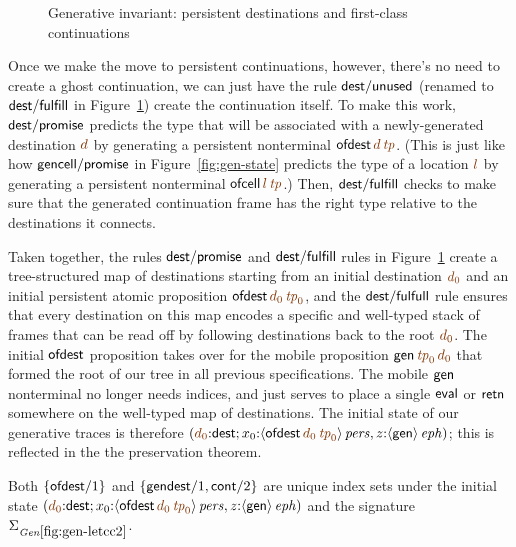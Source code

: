 \smallskip
{}
\smallskip

\begin{figure}[tp]
\caption{Generative invariant: persistent destinations and first-class
  continuations}
\label{fig:gen-letcc2} 
\end{figure}

Once we make the move to persistent continuations, however, there's no
need to create a ghost continuation, we can just have the rule ${\sf
  dest/unused}$ (renamed to ${\sf dest/fulfill}$ in
Figure~\ref{fig:gen-letcc2}) create the continuation itself.  To make
this work, ${\sf dest/promise}$ predicts the type that will be
associated with a newly-generated destination $\lf{d}$ by generating a
persistent nonterminal ${\sf ofdest}\,\lf{d}\,\lf{{\it tp}}$. (This is
just like how ${\sf gencell/promise}$ in Figure~\ref{fig:gen-state}
predicts the type of a location $\lf{l}$ by generating a persistent
nonterminal ${\sf ofcell}\,\lf{l}\,\lf{{\it tp}}$.) Then, ${\sf
  dest/fulfill}$ checks to make sure that the generated continuation
frame has the right type relative to the destinations it connects.

Taken together, the rules ${\sf dest/promise}$ and ${\sf
  dest/fulfill}$ rules in Figure~\ref{fig:gen-letcc2} create a
tree-structured map of destinations starting from an initial
destination $\lf{d_0}$ and an initial persistent atomic proposition
${\sf ofdest}\,\lf{d_0}\,\lf{{\it tp}_0}$, and the ${\sf
  dest/fulfull}$ rule ensures that every destination on this map
encodes a specific and well-typed stack of frames that can be read off
by following destinations back to the root $\lf{d_0}$.  The initial
${\sf ofdest}$ proposition takes over for the mobile proposition ${\sf
  gen}\,\lf{{\it tp}_0}\,\lf{d_0}$ that formed the root of our tree in
all previous specifications. The mobile ${\sf gen}$
nonterminal no longer needs indices, and just serves to place a single
${\sf eval}$ or ${\sf retn}$ somewhere on the well-typed map of
destinations. The initial state of our generative traces is therefore
$\left(\lf{d_0}{:}{\sf dest}; x_0{:}\ispers{\susp{{\sf
        ofdest}\,\lf{d_0}\,\lf{{\it tp}_0}}}, z{:}\iseph{\susp{{\sf
        gen}}}\right)$; this is reflected in the the preservation
theorem.

\bigskip
\begin{lemma} Both $\{ {\sf
    ofdest}/1 \}$ and $\{ {\sf gendest}/1, {\sf cont}/2 \}$ are unique
  index sets under the initial state
  $\left(\lf{d_0}{:}{\sf dest}; x_0{:}\ispers{\susp{{\sf
          ofdest}\,\lf{d_0}\,\lf{{\it tp}_0}}}, z{:}\iseph{\susp{{\sf gen}}}\right)$ and the signature $\siggenletcc$.
\end{lemma}

